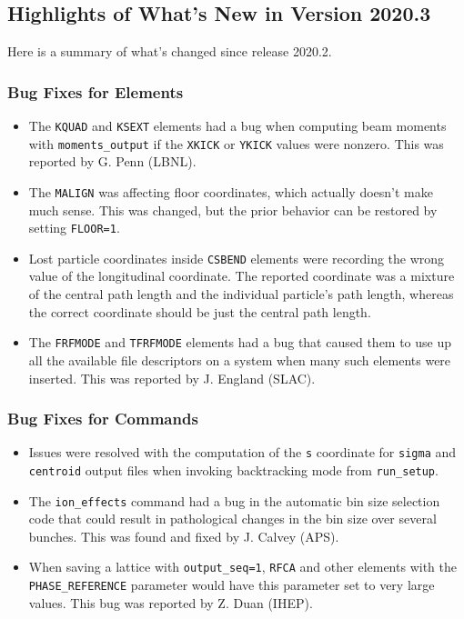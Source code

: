 \documentclass[11pt]{article}
\begin{document}
\subsection{Highlights of What's New in Version 2020.3}

Here is a summary of what's changed since release 2020.2.

\subsubsection{Bug Fixes for Elements}

\begin{itemize}
\item The \verb|KQUAD| and \verb|KSEXT| elements had a bug when computing beam moments with \verb|moments_output|
  if the \verb|XKICK| or \verb|YKICK| values were nonzero. This was reported by G. Penn (LBNL).
\item The \verb|MALIGN| was affecting floor coordinates, which actually doesn't make much sense. This was changed, but
  the prior behavior can be restored by setting \verb|FLOOR=1|.
\item Lost particle coordinates inside \verb|CSBEND| elements were recording the wrong value of the longitudinal coordinate.
  The reported coordinate was a mixture of the central path length and the individual particle's path length, whereas the
  correct coordinate should be just the central path length.
\item The \verb|FRFMODE| and \verb|TFRFMODE| elements had a bug that caused them to use up all the available
  file descriptors on a system when many such elements were inserted. This was reported by J. England (SLAC).
\end{itemize}

\subsubsection{Bug Fixes for Commands}
\begin{itemize}
\item Issues were resolved with the computation of the \verb|s| coordinate for \verb|sigma| and \verb|centroid|
  output files when invoking backtracking mode from \verb|run_setup|.
\item The \verb|ion_effects| command had a bug in the automatic bin size selection code that could result in pathological changes in the
  bin size over several bunches. This was found and fixed by J. Calvey (APS).
\item When saving a lattice with \verb|output_seq=1|, \verb|RFCA| and other elements with the \verb|PHASE_REFERENCE| parameter
  would have this parameter set to very large values. This bug was reported by Z. Duan (IHEP).
\end{itemize}
\end{document}

